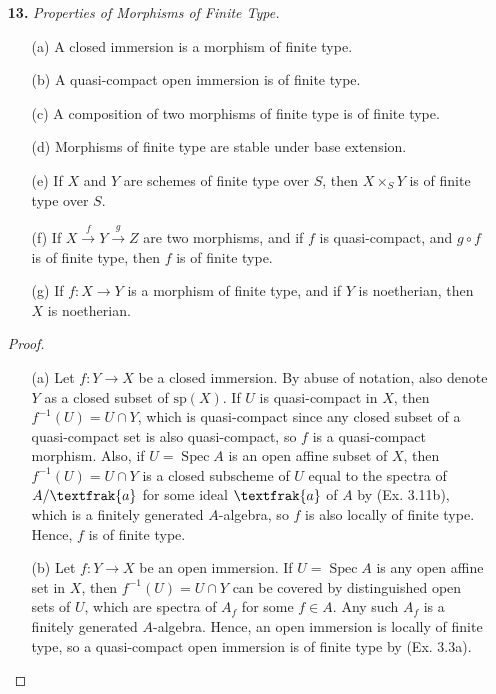 \documentclass{article}
\newcommand{\goth}[1]{\textfrak{#1}}
\DeclareMathOperator{\spec}{Spec}
\begin{document}
\begin{enumerate} [label=\textbf{\arabic*.}, leftmargin=0em]
\item[\textbf{13.}] \textit{Properties of Morphisms of Finite Type.}
\begin{itemize} [leftmargin=0cm]
    \item[(a)] A closed immersion is a morphism of finite type.
    \item[(b)] A quasi-compact open immersion is of finite type.
    \item[(c)] A composition of two morphisms of finite type is of finite type.
    \item[(d)] Morphisms of finite type are stable under base extension.
    \item[(e)] If $X$ and $Y$ are schemes of finite type over $S$, then $X \times_S Y$ is of finite type over $S$.
    \item[(f)] If $X \xrightarrow{f} Y \xrightarrow{g} Z$ are two morphisms, and if $f$ is quasi-compact, and $g \circ f$ is of finite type, then $f$ is of finite type.
    \item[(g)] If $f : X \to Y$ is a morphism of finite type, and if $Y$ is noetherian, then $X$ is noetherian.
\end{itemize}

\begin{proof} $ $ \vspace{0pt}
   \begin{itemize} [leftmargin=0cm]
    \item[(a)] Let $f : Y \to X$ be a closed immersion. By abuse of notation, also denote $Y$ as a closed subset of $\text{sp}(X)$. If $U$ is quasi-compact in $X$, then $f^{-1}(U) = U \cap Y$, which is quasi-compact since any closed subset of a quasi-compact set is also quasi-compact, so $f$ is a quasi-compact morphism. Also, if $U = \spec{A}$ is an open affine subset of $X$, then $f^{-1}(U) = U \cap Y$ is a closed subscheme of $U$ equal to the spectra of $A/ \goth{a}$ for some ideal $\goth{a}$ of $A$ by (Ex. 3.11b), which is a finitely generated $A$-algebra, so $f$ is also locally of finite type. Hence, $f$ is of finite type.

    \item[(b)] Let $f : Y \to X$ be an open immersion. If $U = \spec{A}$ is any open affine set in $X$, then $f^{-1}(U) = U \cap Y$ can be covered by distinguished open sets of $U$, which are spectra of $A_f$ for some $f \in A$. Any such $A_f$ is a finitely generated $A$-algebra. Hence, an open immersion is locally of finite type, so a quasi-compact open immersion is of finite type by (Ex. 3.3a).


\end{itemize}
\end{proof}
\end{enumerate}
\end{document}
